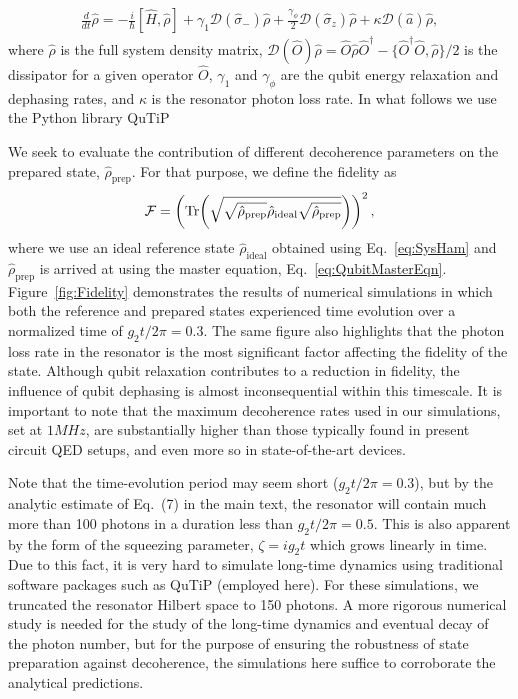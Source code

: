 \begin{align}\label{eq:QubitMasterEqn}
    \frac{d}{dt}\hat{\rho}=-\frac{i}{\hbar}[\hat{H},\hat{\rho}] + \gamma_1 \mathcal{D}(\hat{\sigma}_{-})\hat{\rho} +  \frac{\gamma_{\phi}}{2} \mathcal{D}(\hat{\sigma}_z)\hat{\rho} + \kappa \mathcal{D}(\hat{a})\hat{\rho},
\end{align}
where $\hat{\rho}$ is the full system density matrix, $\mathcal{D}(\hat{O})\hat{\rho}=\hat{O}\hat{\rho}\hat{O}^\dagger - \{\hat{O}^\dagger \hat{O},\hat{\rho}\}/2$ is the dissipator for a given operator $\hat{O}$, $\gamma_1$ and $\gamma_\phi$ are the qubit energy relaxation and dephasing rates, and $\kappa$ is the resonator photon loss rate. In what follows we use the Python library QuTiP \cite{QuTiP}

We seek to evaluate the contribution of different decoherence parameters on the prepared state, $\hat{\rho}_{\text{prep}}$. For that purpose, we define the fidelity as $$\mathcal{F}=\left(\Tr(\sqrt{\sqrt{\hat{\rho}_{\text{prep}}}\hat{\rho}_{\text{ideal}}\sqrt{\hat{\rho}_{\text{prep}}}})\right)^2,$$
where we use an ideal reference state $\hat{\rho}_{\text{ideal}}$ obtained using  Eq.~\eqref{eq:SysHam} and $\hat{\rho}_{\text{prep}}$ is arrived at using the master equation, Eq.~\eqref{eq:QubitMasterEqn}. Figure~\ref{fig:Fidelity} demonstrates the results of numerical simulations in which both the reference and prepared states experienced time evolution over a normalized time of $g_2t/2\pi=0.3$. The same figure also highlights that the photon loss rate in the resonator is the most significant factor affecting the fidelity of the state. Although qubit relaxation contributes to a reduction in fidelity, the influence of qubit dephasing is almost inconsequential within this timescale. It is important to note that the maximum decoherence rates used in our simulations, set at $1MHz$, are substantially higher than those typically found in present circuit QED setups, and even more so in state-of-the-art devices.

Note that the time-evolution period may seem short ($g_2 t/2\pi=0.3$), but by the analytic estimate of Eq.~(7) in the main text, the resonator will contain much more than 100 photons in a duration less than $g_2 t/2\pi=0.5$. This is also apparent by the form of the squeezing parameter, $\zeta=ig_2t$ which grows linearly in time. Due to this fact, it is very hard to simulate long-time dynamics using traditional software packages such as QuTiP (employed here). For these simulations, we truncated the resonator Hilbert space to 150 photons. A more rigorous numerical study is needed for the study of the long-time dynamics and eventual decay of the photon number, but for the purpose of ensuring the robustness of state preparation against decoherence, the simulations here suffice to corroborate the analytical predictions.



